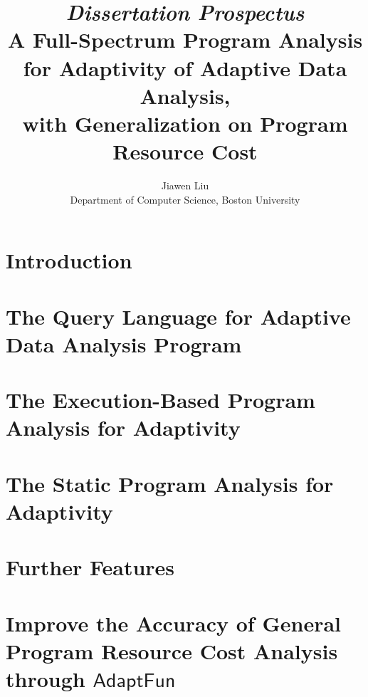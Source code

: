 \documentclass[a4paper,11pt]{article}
\newcommand{\THESYSTEM}{\textsf{AdaptFun}}
\begin{document}
\title{{\em Dissertation Prospectus}
\\ {A Full-Spectrum Program Analysis for Adaptivity of Adaptive Data Analysis}, 
\\ with Generalization on Program Resource Cost}

\author{Jiawen Liu\\ Department of Computer Science, Boston University}
\maketitle
\begin{abstract}

\end{abstract}
\tableofcontents{}

\section{Introduction}
\label{sec:introduction}


\section{The Query Language for Adaptive Data Analysis Program}
\label{sec:language}


\section{The Execution-Based Program Analysis for Adaptivity}
\label{sec:dynamic}


\section{The Static Program Analysis for Adaptivity}
\label{sec:static}



\section{Further Features}
\label{sec:furthers}


\section{Improve the Accuracy of General Program Resource Cost Analysis through $\THESYSTEM$}
\label{sec:generalization}

\end{document}
